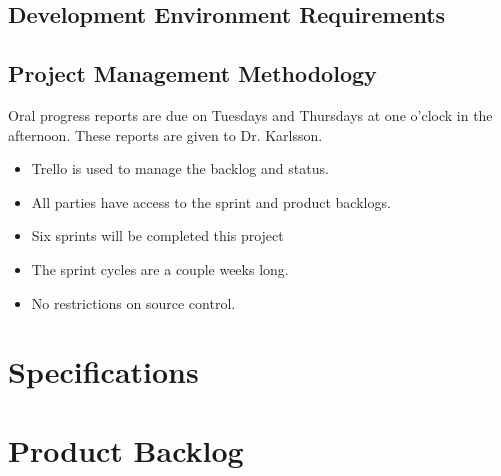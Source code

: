 \subsection{Development Environment Requirements}


\subsection{Project  Management Methodology}

Oral progress reports are due on Tuesdays and Thursdays at one o'clock in the 
afternoon. These reports are given to Dr. Karlsson. 
 
\begin{itemize}
\item Trello is used to manage the backlog and status.
\item All parties have access to the sprint and product backlogs.
\item Six sprints will be completed this project
\item The sprint cycles are a couple weeks long.
\item No restrictions on source control.
\end{itemize}


\section{Specifications}

\section{Product Backlog}

 


